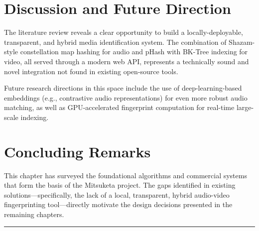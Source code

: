 \section{Discussion and Future Direction}
The literature review reveals a clear opportunity to build a locally-deployable, transparent, and hybrid media identification system. The combination of Shazam-style constellation map hashing for audio and pHash with BK-Tree indexing for video, all served through a modern web API, represents a technically sound and novel integration not found in existing open-source tools.

Future research directions in this space include the use of deep-learning-based embeddings (e.g., contrastive audio representations) for even more robust audio matching, as well as GPU-accelerated fingerprint computation for real-time large-scale indexing.

\section{Concluding Remarks}
This chapter has surveyed the foundational algorithms and commercial systems that form the basis of the Mitsuketa project. The gaps identified in existing solutions---specifically, the lack of a local, transparent, hybrid audio-video fingerprinting tool---directly motivate the design decisions presented in the remaining chapters.

\vspace{10mm}
\hrule